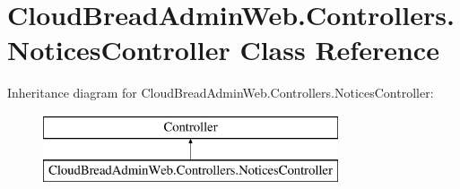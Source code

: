 \hypertarget{class_cloud_bread_admin_web_1_1_controllers_1_1_notices_controller}{}\section{Cloud\+Bread\+Admin\+Web.\+Controllers.\+Notices\+Controller Class Reference}
\label{class_cloud_bread_admin_web_1_1_controllers_1_1_notices_controller}
Inheritance diagram for Cloud\+Bread\+Admin\+Web.\+Controllers.\+Notices\+Controller\+:\begin{figure}[H]
\begin{center}
\leavevmode
\includegraphics[height=2.000000cm]{class_cloud_bread_admin_web_1_1_controllers_1_1_notices_controller}
\end{center}
\end{figure}

